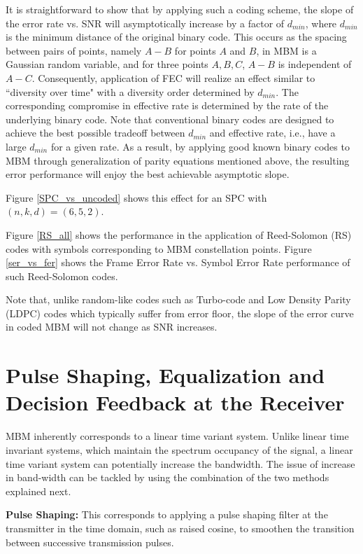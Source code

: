 It is straightforward to show that by applying such a coding scheme, the slope of the error rate vs. SNR will asymptotically increase by a factor of $d_{min}$, where $d_{min}$ is the minimum distance of the original binary code. This occurs as the spacing between pairs of points, namely $A-B$ for points $A$ and $B$, in MBM is a Gaussian random variable, and for three points $A,B,C$, $A-B$ is independent of $A-C$.
Consequently, application of FEC will realize an effect similar to ``diversity over time" with a diversity order determined by $d_{min}$. The corresponding compromise in effective rate is determined by the rate of the underlying binary
 code. Note that conventional binary codes are designed to achieve the best possible tradeoff between $d_{min}$ and effective rate, i.e., have a large $d_{min}$ for a given rate. As a result, by applying good known binary codes to MBM through generalization
 of parity equations mentioned above, the resulting error performance will enjoy the best achievable asymptotic slope.


Figure \ref{SPC_vs_uncoded} shows this effect for an SPC with $(n,k,d)=(6,5,2)$.


Figure \ref{RS_all} shows the performance in the application of Reed-Solomon (RS) codes with symbols corresponding to MBM constellation points. Figure \ref{ser_vs_fer} shows the Frame Error Rate vs. Symbol Error Rate performance of such Reed-Solomon codes.


Note that, unlike random-like codes such as Turbo-code and Low Density Parity (LDPC) codes which typically suffer from error floor, the slope of the error curve in coded MBM will not change as SNR increases.


\section {Pulse Shaping, Equalization and Decision Feedback at the Receiver}
\label{sec : Pulse Shaping}
MBM inherently corresponds to a linear time variant system. Unlike linear time invariant systems, which maintain the spectrum occupancy of the signal, a linear time variant system can potentially increase the bandwidth. The issue of increase in band-width can be tackled by using the combination of the two methods explained next.

\textbf{Pulse Shaping:} This corresponds to applying a pulse shaping filter at the transmitter in the time domain, such as raised cosine, to smoothen the transition between successive transmission pulses.


